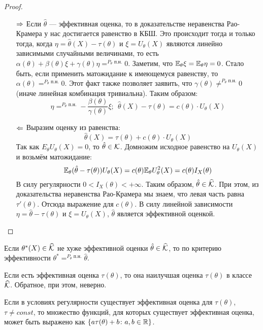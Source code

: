 \begin{proof}~
	\begin{itemize}
		\item[$\Rightarrow$] Если $\hat{\theta}$ --- эффективная оценка, то в доказательстве неравенства Рао-Крамера у нас достигается равенство в КБШ. Это происходит тогда и только тогда, когда $\eta = \hat{\theta}(X) - \tau(\theta)$ и $\xi = U_\theta(X)$ являются линейно зависимыми случайными величинами, то есть $\alpha(\theta) + \beta(\theta)\xi + \gamma(\theta)\eta =^{P_\theta\text{ п.н.}} 0$. Заметим, что $\mathbb{E}_\theta \xi = \mathbb{E}_\theta \eta = 0$. Стало быть, если применить матожидание к имеющемуся равенству, то $\alpha(\theta) =^{P_\theta\text{ п.н.}} 0$. Этот факт также позволяет заявить, что $\gamma(\theta) \neq^{P_\theta\text{ п.н.}} 0$ (иначе линейная комбинация тривиальна). Таким образом:
		\[
			\eta =^{P_\theta\text{ п.н.}} -\frac{\beta(\theta)}{\gamma(\theta)}\xi;\ \ \hat{\theta}(X) - \tau(\theta) = c(\theta) \cdot U_\theta(X)
		\]
		
		\item[$\Leftarrow$] Выразим оценку из равенства:
		\[
			\hat{\theta}(X) = \tau(\theta) + c(\theta) \cdot U_\theta(X)
		\]
		Так как $E_\theta U_\theta(X) = 0$, то $\hat{\theta} \in \mathcal{K}$. Домножим исходное равенство на $U_\theta(X)$ и возьмём матожидание:
		\[
			\mathbb{E}_\theta (\hat{\theta} - \tau(\theta))U_\theta(X) = c(\theta) \mathbb{E}_\theta U_\theta^2(X) = c(\theta) I_X(\theta)
		\]
		В силу регулярности $0 < I_X(\theta) < +\infty$. Таким образом, $\hat{\theta} \in \widehat{\mathcal{K}}$. При этом, из доказательства неравенства Рао-Крамера мы знаем, что левая часть равна $\tau'(\theta)$. Отсюда выражение для $c(\theta)$. В силу линейной зависимости $\eta = \hat{\theta} - \tau(\theta)$ и $\xi = U_\theta(X)$, $\hat{\theta}$ является эффективной оценкой.
	\end{itemize}
\end{proof}

\begin{corollary}
	Если $\theta^*(X) \in \widehat{\mathcal{K}}$ не хуже эффективной оценки $\hat{\theta} \in \widehat{\mathcal{K}}$, то по критерию эффективности $\theta^* =^{P_\theta\text{ п.н.}} \hat{\theta}$.
\end{corollary}

\begin{note}
	Если есть эффективная оценка $\tau(\theta)$, то она наилучшая оценка $\tau(\theta)$ в классе $\widehat{\mathcal{K}}$. Обратное, при этом, неверно.
\end{note}

\begin{theorem}
	Если в условиях регулярности существует эффективная оценка для $\tau(\theta)$, $\tau \neq const$, то множество функций, для которых существует эффективная оценка, может быть выражено как $\{a\tau(\theta) + b \colon a, b \in \mathbb{R}\}$.
\end{theorem}

